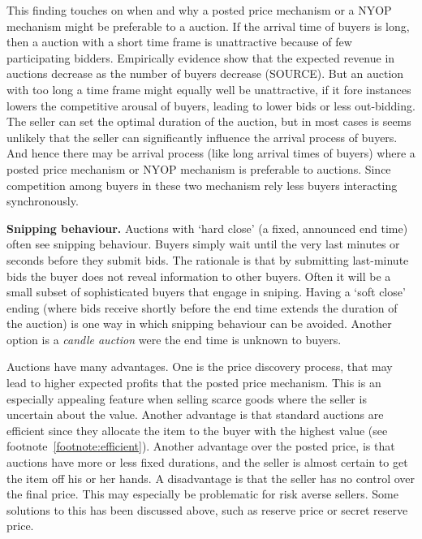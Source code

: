 \documentclass[a4paper,12pt]{article}
\begin{document}
This finding touches on when and why a posted price mechanism or a NYOP mechanism might be preferable to a auction. If the arrival time of buyers is long, then a auction with a short time frame is unattractive because of few participating bidders. Empirically evidence show that the expected revenue in auctions decrease as the number of buyers decrease (SOURCE). But an auction with too long a time frame might equally well be unattractive, if it fore instances lowers the competitive arousal of buyers, leading to lower bids or less out-bidding. The seller can set the optimal duration of the auction, but in most cases is seems unlikely that the seller can significantly influence the arrival process of buyers. And hence there may be arrival process (like long arrival times of buyers) where a posted price mechanism or NYOP mechanism is preferable to auctions. Since competition among buyers in these two mechanism rely less buyers interacting synchronously.

	{\bf Snipping behaviour.} Auctions with `hard close' (a fixed, announced end time) often see snipping behaviour. Buyers simply wait until the very last minutes or seconds before they submit bids. The rationale is that by submitting last-minute bids the buyer does not reveal information to other buyers. Often it will be a small subset of sophisticated buyers that engage in sniping. Having a `soft close' ending (where bids receive shortly before the end time extends the duration of the auction) is one way in which snipping behaviour can be avoided. Another option is a \emph{candle auction} were the end time is unknown to buyers. %

	Auctions have many advantages. One is the price discovery process, that may lead to higher expected profits that the posted price mechanism. This is an especially appealing feature when selling scarce goods where the seller is uncertain about the value. Another advantage is that standard auctions are efficient since they allocate the item to the buyer with the highest value (see footnote~\ref{footnote:efficient}). Another advantage over the posted price, is that auctions have more or less fixed durations, and the seller is almost certain to get the item off his or her hands. A disadvantage is that the seller has no control over the final price. This may especially be problematic for risk averse sellers. Some solutions to this has been discussed above, such as reserve price or secret reserve price.
\end{document}
